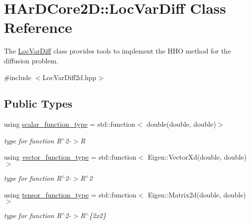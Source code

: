 \hypertarget{classHArDCore2D_1_1LocVarDiff}{}\section{H\+Ar\+D\+Core2D\+:\+:Loc\+Var\+Diff Class Reference}
\label{classHArDCore2D_1_1LocVarDiff}


The \hyperlink{classHArDCore2D_1_1LocVarDiff}{Loc\+Var\+Diff} class provides tools to implement the H\+HO method for the diffusion problem.  




{\ttfamily \#include $<$Loc\+Var\+Diff2d.\+hpp$>$}

\subsection*{Public Types}
\begin{DoxyCompactItemize}
\item 
\mbox{\label{classHArDCore2D_1_1LocVarDiff_a1bb6dadd227f308545e68ec2b18d457c}} 
using \hyperlink{classHArDCore2D_1_1LocVarDiff_a1bb6dadd227f308545e68ec2b18d457c}{scalar\+\_\+function\+\_\+type} = std\+::function$<$ double(double, double)$>$
\begin{DoxyCompactList}\small\item\em type for function R$^\wedge$2-\/$>$R \end{DoxyCompactList}\item 
\mbox{\label{classHArDCore2D_1_1LocVarDiff_a44128fac430109885d14ac8582a68809}} 
using \hyperlink{classHArDCore2D_1_1LocVarDiff_a44128fac430109885d14ac8582a68809}{vector\+\_\+function\+\_\+type} = std\+::function$<$ Eigen\+::\+Vector\+Xd(double, double)$>$
\begin{DoxyCompactList}\small\item\em type for function R$^\wedge$2-\/$>$R$^\wedge$2 \end{DoxyCompactList}\item 
\mbox{\label{classHArDCore2D_1_1LocVarDiff_a68ac1fa2f65fa77a2f21c8ff28f8c36f}} 
using \hyperlink{classHArDCore2D_1_1LocVarDiff_a68ac1fa2f65fa77a2f21c8ff28f8c36f}{tensor\+\_\+function\+\_\+type} = std\+::function$<$ Eigen\+::\+Matrix2d(double, double)$>$
\begin{DoxyCompactList}\small\item\em type for function R$^\wedge$2-\/$>$R$^\wedge$\{2x2\} \end{DoxyCompactList}\end{DoxyCompactItemize}
